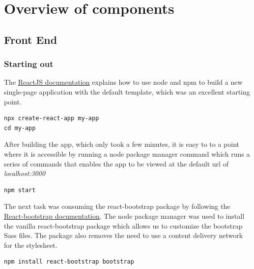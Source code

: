 \section{Overview of components}
\subsection{Front End}

\subsubsection{Starting out}
The \underline{\href{https://react-bootstrap.github.io/getting-started/introduction/}{ReactJS documentation}} explains how to use node and npm to build a new single-page application with the default template, which was an excellent starting point.
\begin{verbatim}
npx create-react-app my-app
cd my-app
\end{verbatim}

After building the app, which only took a few minutes, it is easy to to a point where it is accessible by running a node package manager command which runs a series of commands that enables the app to be viewed at the default url of \emph{localhost:3000}
\begin{verbatim}
npm start
\end{verbatim}

The next task was consuming the react-bootstrap package by following the \underline{\href{https://react-bootstrap.github.io/getting-started/introduction/}{React-bootstrap documentation}}. The node package manager was used to install the vanilla react-bootstrap package which allows us to customize the bootstrap Sass files. The package also removes the need to use a content delivery network for the stylesheet.
\begin{verbatim}
npm install react-bootstrap bootstrap
\end{verbatim}

